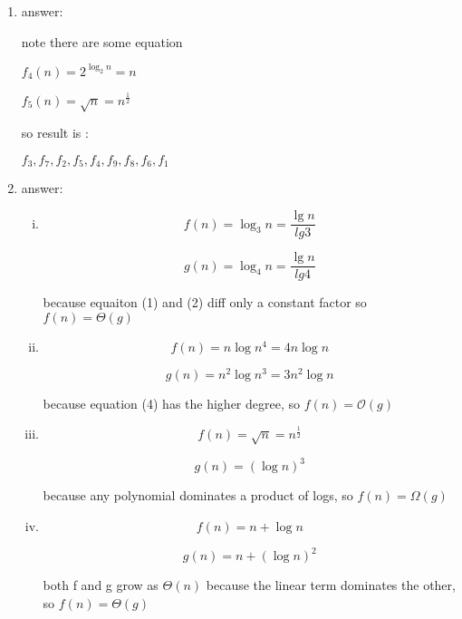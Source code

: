 \documentclass[11pt]{article}
\newenvironment{qparts}{\begin{enumerate}[{(}a{)}]}{\end{enumerate}}
\begin{document}
\begin{qparts}
\item answer:

note there are some equation

$ f_4(n) =2^{\log_{2}{n}} = n $

$ f_5(n) = \sqrt{n} =  n^{\frac{1}{2}} $

so result is :

$ f_3,f_7,f_2,f_5,f_4,f_9,f_8,f_6,f_1 $

\item answer:

\begin{enumerate}[i.]
    \item
    \begin{equation}
        f(n) = \log_3{n} = \frac{\lg{n}}{lg{3}}  \label{1}
    \end{equation}

    \begin{equation}
        g(n) = \log_4{n} = \frac{\lg{n}}{lg{4}}  \label{2}
    \end{equation}
    
    because equaiton (1) and (2) diff only a constant factor so  $ f(n) = \Theta(g) $
    
    \item
    \begin{equation}
        f(n) = n\log{n^4} = 4n\log{n}  \label{3}
    \end{equation}
    
    \begin{equation}
        g(n) = n^2\log{n^3} = 3n^2\log{n}  \label{4}
    \end{equation}
    
    because equation (4) has the higher degree, so $ f(n) = \mathcal{O}(g) $

    \item
    \begin{equation}
        f(n) = \sqrt{n} = n^{\frac{1}{2}} \label{5}
    \end{equation}
    
    \begin{equation}
        g(n) = (\log{n})^3  \label{6}
    \end{equation}
    
    because any polynomial dominates a product of logs, so $ f(n) = \Omega{(g)} $
    
    \item
    \begin{equation}
        f(n) = n + \log{n} \label{5}
    \end{equation}
    
    \begin{equation}
        g(n) = n + (\log{n})^2  \label{6}
    \end{equation}
    
    both f and g grow as $ \Theta(n) $ because the linear term dominates the other, so  $ f(n) = \Theta(g) $

\end{enumerate}
\end{qparts}
\end{document}
